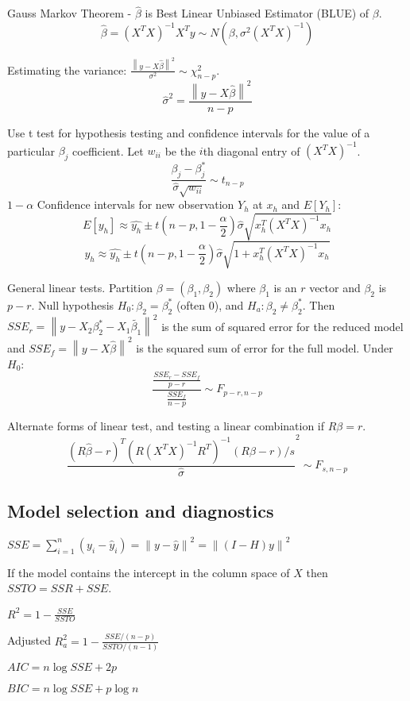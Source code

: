 \documentclass[10pt, twocolumn]{article}
\newcommand{\norm}[1]{\left\lVert#1\right\rVert}
\begin{document}
Gauss Markov Theorem - $\hat{\beta}$ is Best Linear Unbiased
Estimator (BLUE) of $\beta$.
\[
    \hat{\beta} = (X^T X)^{-1} X^T y \sim N(\beta, \sigma^2 (X^T X)^{-1})
\]

Estimating the variance: $\frac{\norm{y - X \hat{\beta}}^2}{\sigma^2} \sim
\chi^2_{n-p}$.
\[
    \hat{\sigma}^2 = \frac{\norm{y - X \hat{\beta}}^2}{n - p}
\]

Use t test for hypothesis testing and confidence intervals for the value of
a particular $\beta_j$ coefficient. 
Let $w_{ii}$ be the $i$th diagonal entry of $(X^T X)^{-1}$.
\[
    \frac{\beta_j - \beta_j^*}{\hat{\sigma} \sqrt{w_{ii}}} \sim t_{n-p}
\]
$1 - \alpha$ Confidence intervals for new observation $Y_h$ at $x_h$ and $E[Y_h]$:
\[
    E[y_h] \approx \hat{y_h} \pm t(n-p, 1 - \frac{\alpha}{2}) \hat{\sigma}
        \sqrt{x_h^T (X^T X)^{-1} x_h}
\]
\[
    y_h \approx \hat{y_h} \pm t(n-p, 1 - \frac{\alpha}{2}) \hat{\sigma}
        \sqrt{1 + x_h^T (X^T X)^{-1} x_h}
\]

General linear tests. Partition $\beta = (\beta_1, \beta_2)$ where $\beta_1$
is an $r$ vector and $\beta_2$ is $p - r$. Null hypothesis $H_0: \beta_2 =
\beta_2^*$ (often 0), and $H_a: \beta_2 \neq \beta_2^*$. Then
$SSE_r = \norm{y - X_2 \beta_2^* - X_1 \tilde{\beta_1}}^2$ is the sum of
squared error for the reduced model and 
$SSE_f = \norm{y - X \hat{\beta}}^2$ is the squared sum of error for the
full model.
Under $H_0$:
\[
    \frac{\frac{SSE_r - SSE_f}{p - r}}
         {\frac{SSE_f}{n - p}}
         \sim F_{p-r, n-p}
\]

Alternate forms of linear test, and testing a linear combination if $R\beta
= r$.
\[
    \frac{(R \hat{\beta} - r)^T (R(X^T X)^{-1} R^T)^{-1} (R \beta - r) / s}
    {\hat{\sigma}}^2 \sim F_{s, n-p}
\]

\subsection*{Model selection and diagnostics}

$SSE = \sum_{i=1}^n (y_i - \hat{y}_i) = \norm{y - \hat{y}}^2
        = \norm{(I - H)y}^2$

If the model contains the intercept in the column space of $X$  then $SSTO = SSR + SSE$.

$R^2 = 1 - \frac{SSE}{SSTO}$

Adjusted $R^2_a = 1 - \frac{SSE / (n-p)}{SSTO / (n-1)}$

$AIC = n \log SSE + 2p$

$BIC = n \log SSE + p \log n$
\end{document}
